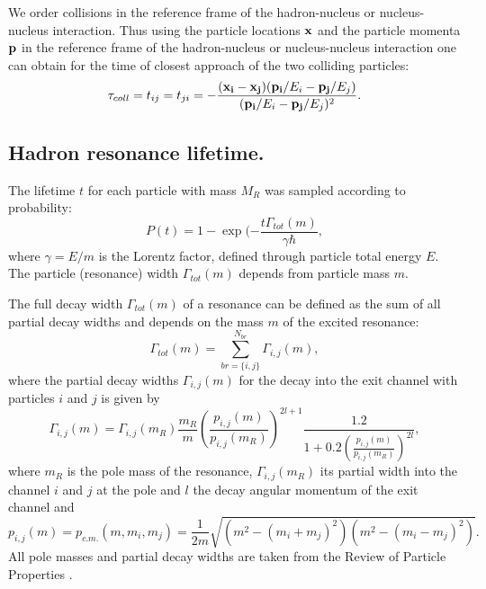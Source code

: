 We order collisions in the reference frame of the hadron-nucleus or
nucleus-nucleus interaction.
Thus using the particle locations ${\bf x}$ and the particle
momenta ${\bf p}$ in the reference frame of the hadron-nucleus or
nucleus-nucleus interaction one can obtain for the time of closest
approach of the two colliding particles:
\begin{equation}
\label{SCD4} \tau_{coll}=t_{ij}=t_{ji}=
-\frac{({\bf x_i} - {\bf x_j})  ({\bf p_i}/E_i - {\bf
p_j}/E_j)}{({\bf p_i}/E_i - {\bf p_j}/E_j)^2}.
\end{equation} 
  
\subsection{Hadron resonance lifetime.}

\hspace{1.0em}The lifetime  $t$ for each particle with mass $M_R$ was
sampled according to probability:
\begin{equation}
\label{SCD5} P(t) = 1 -\exp{(-\frac{t\Gamma_{tot}(m)}{\gamma \hbar}}, 
\end{equation}
where $\gamma = E/m$ is the Lorentz factor, defined through particle
total energy $E$. The particle (resonance) width $\Gamma_{tot}(m)$
depends from particle mass $m$.

The full decay width $\Gamma_{tot}(m)$ of a resonance can be defined as
the sum of all partial decay widths and depends on the mass $m$ of the
excited resonance:
\begin{equation}
\label{SCD6} \Gamma_{tot}(m) = \sum_{br =\{i,j\}}^{N_{br}} \Gamma_{i,j}(m),
\end{equation}
where the partial decay widths $\Gamma_{i,j}(m)$ for the decay into the
exit channel with particles $i$ and $j$ is given by \cite{URQMD97}
\begin{equation}
\label{SCD7}\Gamma_{i,j}(m)=\Gamma_{i,j}(m_R)\frac{m_R}{m}(\frac{p_{i,j}(m)}
{p_{i,j}(m_R)})^{2l+1}\frac{1.2}{1+0.2(\frac{p_{i,j}(m)}
{p_{i,j}(m_R)})^{2l}},
\end{equation} 
where $m_R$ is the pole mass of the resonance, $\Gamma_{i,j}(m_R)$ its
partial width into the channel $i$ and $j$ at the pole and $l$ the decay
angular momentum of the exit channel and
\begin{equation}
\label{SCD8} p_{i,j}(m) = p_{c.m.}(m, m_i, m_j)= 
\frac{1}{2m}\sqrt{(m^2 - (m_i + m_j)^2)(m^2 - (m_i -
m_j)^2)}. 
\end{equation}
 All pole masses and partial
decay widths are taken from the Review of Particle Properties
\cite{PDG96}.
